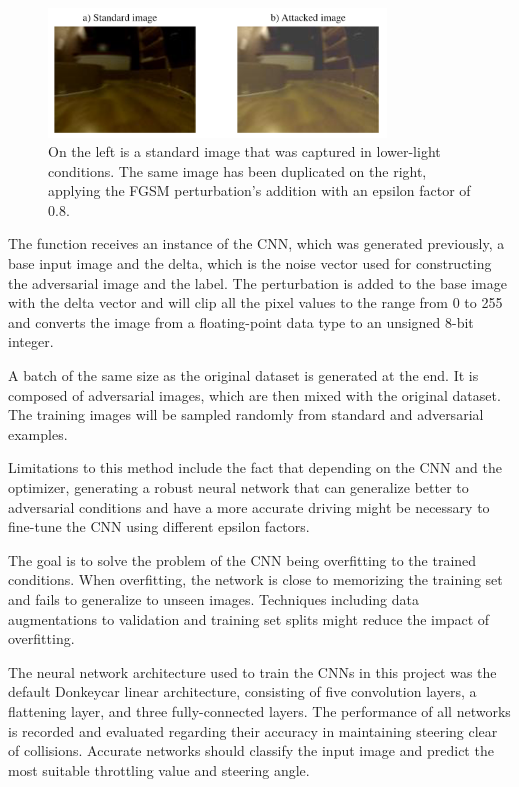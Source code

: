 \documentclass[12pt]{article}
\begin{document}
\begin{figure} [H] %
\begin{center}
\includegraphics[width=0.8\textwidth]{figures/attaked-standard-images.png}
\caption{On the left is a standard image that was captured in lower-light conditions. The same image has been duplicated on the right, applying the FGSM perturbation's addition with an epsilon factor of 0.8.}
\label{fig:attackstandard}
\end{center}
\end{figure}

The function receives an instance of the CNN, which was generated previously, a base input image and the delta, which is the noise vector used for constructing the adversarial image and the label. The perturbation is added to the base image with the delta vector and will clip all the pixel values to the range from 0 to 255 and converts the image from a floating-point data type to an unsigned 8-bit integer. 

A batch of the same size as the original dataset is generated at the end. It is composed of adversarial images, which are then mixed with the original dataset. The training images will be sampled randomly from standard and adversarial examples. 

Limitations to this method include the fact that depending on the CNN and the optimizer, generating a robust neural network that can generalize better to adversarial conditions and have a more accurate driving might be necessary to fine-tune the CNN using different epsilon factors. 

The goal is to solve the problem of the CNN being overfitting to the trained conditions. When overfitting, the network is close to memorizing the training set and fails to generalize to unseen images. Techniques including data augmentations to validation and training set splits might reduce the impact of overfitting.

The neural network architecture used to train the CNNs in this project was the default Donkeycar linear architecture, consisting of five convolution layers, a flattening layer, and three fully-connected layers. The performance of all networks is recorded and evaluated regarding their accuracy in maintaining steering clear of collisions. Accurate networks should classify the input image and predict the most suitable throttling value and steering angle. 
\end{document}
